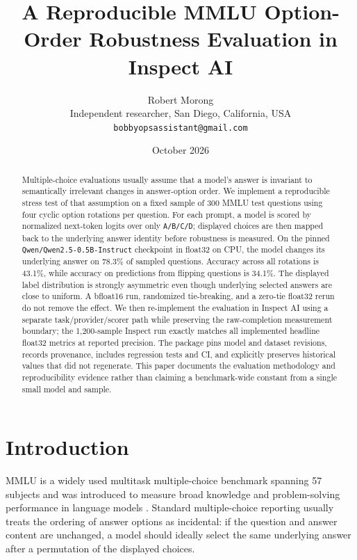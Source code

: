 \documentclass[10pt]{article}
\title{A Reproducible MMLU Option-Order Robustness Evaluation in Inspect AI}
\author{Robert Morong\\Independent researcher, San Diego, California, USA\\\texttt{bobbyopsassistant@gmail.com}}
\date{October 2026}
\begin{document}
\maketitle

\begin{abstract}
Multiple-choice evaluations usually assume that a model's answer is invariant to semantically irrelevant changes in answer-option order. We implement a reproducible stress test of that assumption on a fixed sample of 300 MMLU test questions using four cyclic option rotations per question. For each prompt, a model is scored by normalized next-token logits over only \texttt{A/B/C/D}; displayed choices are then mapped back to the underlying answer identity before robustness is measured. On the pinned \texttt{Qwen/Qwen2.5-0.5B-Instruct} checkpoint in float32 on CPU, the model changes its underlying answer on 78.3\% of sampled questions. Accuracy across all rotations is 43.1\%, while accuracy on predictions from flipping questions is 34.1\%. The displayed label distribution is strongly asymmetric even though underlying selected answers are close to uniform. A bfloat16 run, randomized tie-breaking, and a zero-tie float32 rerun do not remove the effect. We then re-implement the evaluation in Inspect AI using a separate task/provider/scorer path while preserving the raw-completion measurement boundary; the 1,200-sample Inspect run exactly matches all implemented headline float32 metrics at reported precision. The package pins model and dataset revisions, records provenance, includes regression tests and CI, and explicitly preserves historical values that did not regenerate. This paper documents the evaluation methodology and reproducibility evidence rather than claiming a benchmark-wide constant from a single small model and sample.
\end{abstract}

\section{Introduction}

MMLU is a widely used multitask multiple-choice benchmark spanning 57 subjects and was introduced to measure broad knowledge and problem-solving performance in language models \cite{hendrycks2020mmlu}. Standard multiple-choice reporting usually treats the ordering of answer options as incidental: if the question and answer content are unchanged, a model should ideally select the same underlying answer after a permutation of the displayed choices.
\end{document}

